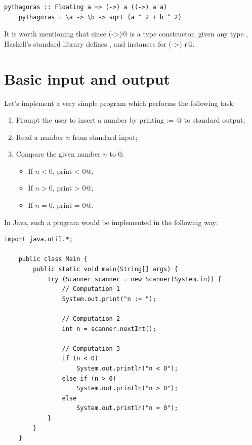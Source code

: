 \documentclass[UdineBachThesis,american,11pt]{PhdThesis}
\begin{document}
  \begin{lstlisting}[gobble=4,basicstyle=\ttfamily\small]
    pythagoras :: Floating a => (->) a ((->) a a)
    pythagoras = \a -> \b -> sqrt (a ^ 2 + b ^ 2)
  \end{lstlisting}

  It is worth mentioning that since \lstinline@(->)@ is a type constructor,
  given any type \lstinline@r@, Haskell's standard library defines
  \lstinline@Functor@, \lstinline@Applicative@ and \lstinline@Monad@ instances
  for \lstinline@(->) r@.

  \section{Basic input and output}

  Let's implement a very simple program which performs the following task:

  \begin{enumerate}
    \item Prompt the user to insert a number by printing \lstinline@n := @ to
    standard output;

    \item Read a number $n$ from standard input;

    \item Compare the given number $n$ to $0$:

    \begin{itemize}[noitemsep]
      \item If $n < 0$, print \lstinline@n < 0@;
      \item If $n > 0$, print \lstinline@n > 0@;
      \item If $n = 0$, print \lstinline@n = 0@.
    \end{itemize}
  \end{enumerate}

  In Java, such a program would be implemented in the following way:

  \begin{lstlisting}[gobble=4,basicstyle=\ttfamily\small]
    import java.util.*;

    public class Main {
        public static void main(String[] args) {
            try (Scanner scanner = new Scanner(System.in)) {
                // Computation 1
                System.out.print("n := ");

                // Computation 2
                int n = scanner.nextInt();

                // Computation 3
                if (n < 0)
                    System.out.println("n < 0");
                else if (n > 0)
                    System.out.println("n > 0");
                else
                    System.out.println("n = 0");
            }
        }
    }
  \end{lstlisting}
\end{document}
